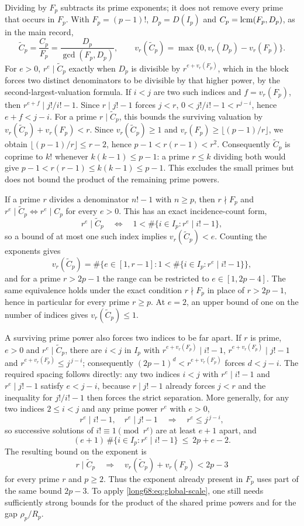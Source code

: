 \documentclass[11pt]{article}
\begin{document}
Dividing by $F_p$ subtracts its prime exponents; it does not remove every
prime that occurs in $F_p$. With $F_p=(p-1)!$,
$D_p=D(I_p)$ and $C_p=\operatorname{lcm}(F_p,D_p)$, as in the main record,
\[
 \widetilde C_p=\frac{C_p}{F_p}=\frac{D_p}{\gcd(F_p,D_p)},\qquad
 v_r(\widetilde C_p)=\max\{0,v_r(D_p)-v_r(F_p)\} .
\]
For $e>0$, $r^e\mid\widetilde C_p$ exactly when $D_p$ is divisible by
$r^{e+v_r(F_p)}$, which in the block forces two distinct denominators to be divisible
by that higher power, by the second-largest-valuation formula. If $i<j$
are two such indices and $f=v_r(F_p)$, then
$r^{e+f}\mid j!/i!-1$. Since $r\mid j!-1$ forces $j<r$,
$0<j!/i!-1<r^{j-i}$, hence $e+f<j-i$.
For a prime $r\mid\widetilde C_p$, this bounds the surviving valuation by
$v_r(\widetilde C_p)+v_r(F_p)<r$. Since $v_r(\widetilde C_p)\ge1$ and
$v_r(F_p)\ge\lfloor(p-1)/r\rfloor$, we obtain
$\lfloor(p-1)/r\rfloor\le r-2$, hence $p-1<r(r-1)<r^2$.
Consequently $\widetilde C_p$ is coprime to $k!$ whenever
$k(k-1)\le p-1$: a prime $r\le k$ dividing both would give
$p-1<r(r-1)\le k(k-1)\le p-1$. This excludes the small primes but does not bound the
product of the remaining prime powers.

If a prime $r$ divides a denominator $n!-1$ with $n\ge p$,
then $r\nmid F_p$ and $r^e\mid\widetilde C_p\iff r^e\mid C_p$ for every
$e>0$.  This has an exact incidence-count form,
\[
 r^e\mid\widetilde C_p
 \quad\Longleftrightarrow\quad
 1<\#\{i\in I_p:r^e\mid i!-1\},
\]
so a bound of at most one such index implies $v_r(\widetilde C_p)<e$.
Counting the exponents gives
\[
 v_r(\widetilde C_p)=\#\bigl\{e\in[1,r-1]:1<\#\{i\in I_p:r^e\mid i!-1\}\bigr\},
\]
and for a prime $r>2p-1$ the range can be restricted to
$e\in[1,2p-4]$.  The same equivalence holds under the exact condition
$r\nmid F_p$ in place of $r>2p-1$, hence in particular for every prime
$r\ge p$. At $e=2$, an upper bound of one on the number of indices gives
$v_r(\widetilde C_p)\le1$.

A surviving prime power also forces two indices to be far apart.  If $r$ is prime, $e>0$ and
$r^e\mid\widetilde C_p$, there are $i<j$ in $I_p$ with
$r^{e+v_r(F_p)}\mid i!-1$, $r^{e+v_r(F_p)}\mid j!-1$ and
$r^{e+v_r(F_p)}\le j^{\,j-i}$; consequently $(2p-1)^d<r^{e+v_r(F_p)}$ forces
$d<j-i$.  The required spacing follows directly: any two indices $i<j$ with $r^e\mid i!-1$ and
$r^e\mid j!-1$ satisfy $e<j-i$, because $r\mid j!-1$ already forces $j<r$ and the
inequality for $j!/i!-1$ then forces the strict separation. More generally,
for any two indices $2\le i<j$ and any prime power $r^e$ with $e>0$,
\[
 r^e\mid i!-1,\quad r^e\mid j!-1
 \quad\Longrightarrow\quad r^e\le j^{\,j-i},
\]
so successive solutions of $i!\equiv1\pmod{r^e}$ are at least $e+1$
apart, and
\[
 (e+1)\,\#\{i\in I_p:r^e\mid i!-1\}\ \le\ 2p+e-2 .
\]
The resulting bound on the exponent is
\[
 r\mid\widetilde C_p
 \quad\Longrightarrow\quad
 v_r(\widetilde C_p)+v_r(F_p)<2p-3
\]
for every prime $r$ and $p\ge2$. Thus the exponent already present in
$F_p$ uses part of the same bound $2p-3$. To apply
\eqref{long68:eq:global-scale}, one still needs sufficiently strong bounds
for the product of the shared prime powers and for the gap $\rho_p/R_p$.
\end{document}
